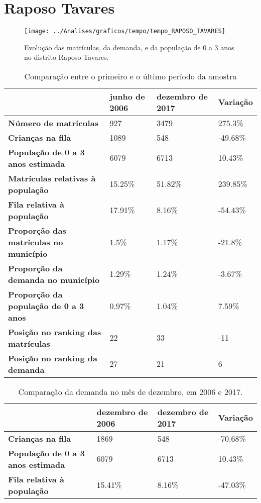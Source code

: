\section{Raposo Tavares}
\begin{figure}[H]
\centering
\texttt{[image: ../Analises/graficos/tempo/tempo\_RAPOSO\_TAVARES]}
\caption{Evolução das matrículas, da demanda, e da população de 0 a 3 anos no distrito Raposo Tavares.}
\end{figure}
\begin{table}[H]
\begin{tabular}{|l|l|l|l|}
\hline
\textbf{}                                      & \textbf{junho de 2006}       & \textbf{dezembro de 2017}    & \textbf{Variação} \\ \hline
\textbf{Número de matrículas}                  & 927 & 3479 & 275.3\% \\ \hline
\textbf{Crianças na fila}                      & 1089 & 548 & -49.68\% \\ \hline
\textbf{População de 0 a 3 anos estimada}      & 6079 & 6713 & 10.43\% \\ \hline
\textbf{Matrículas relativas à população}      & 15.25\% & 51.82\% & 239.85\% \\ \hline
\textbf{Fila relativa à população}             & 17.91\% & 8.16\% & -54.43\% \\ \hline
\textbf{Proporção das matrículas no município} & 1.5\% & 1.17\% & -21.8\% \\ \hline
\textbf{Proporção da demanda no município}     & 1.29\% & 1.24\% & -3.67\% \\ \hline
\textbf{Proporção da população de 0 a 3 anos}  & 0.97\% & 1.04\% & 7.59\% \\ \hline
\textbf{Posição no ranking das matrículas}     & 22 & 33 & -11 \\ \hline
\textbf{Posição no ranking da demanda}         & 27 & 21 & 6 \\ \hline
\end{tabular}
\caption{Comparação entre o primeiro e o último período da amostra}
\end{table}
\begin{table}[H]
\begin{tabular}{|l|l|l|l|}
\hline
\textbf{}                                 & \textbf{dezembro de 2006} & \textbf{dezembro de 2017} & \textbf{Variação} \\ \hline
\textbf{Crianças na fila}                      & 1869 & 548 & -70.68\% \\ \hline
\textbf{População de 0 a 3 anos estimada}      & 6079 & 6713 & 10.43\% \\ \hline
\textbf{Fila relativa à população}             & 15.41\% & 8.16\% & -47.03\% \\ \hline
\end{tabular}
\caption{Comparação da demanda no mês de dezembro, em 2006 e 2017.}
\end{table}
